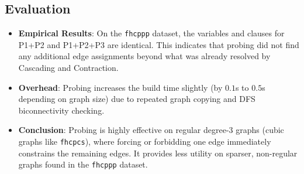 \subsection{Evaluation}
\begin{itemize}
    \item \textbf{Empirical Results}: On the \texttt{fhcppp} dataset, the variables and clauses for P1+P2 and P1+P2+P3 are identical. This indicates that probing did not find any additional edge assignments beyond what was already resolved by Cascading and Contraction.
    \item \textbf{Overhead}: Probing increases the build time slightly (by $0.1$s to $0.5$s depending on graph size) due to repeated graph copying and DFS biconnectivity checking.
    \item \textbf{Conclusion}: Probing is highly effective on regular degree-3 graphs (cubic graphs like \texttt{fhcpcs}), where forcing or forbidding one edge immediately constrains the remaining edges. It provides less utility on sparser, non-regular graphs found in the \texttt{fhcppp} dataset.
\end{itemize}

